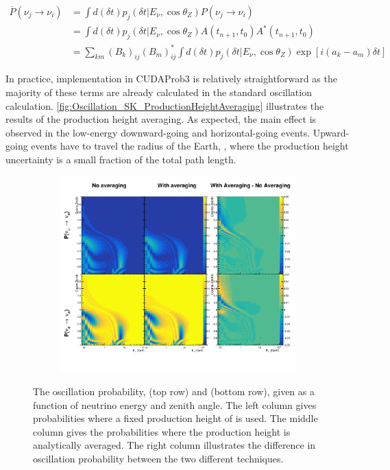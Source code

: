 \begin{equation}
  \begin{split}
    \overline P(\nu_{j} \rightarrow \nu_{i}) &= \int d(\delta t) p_{j}(\delta t|E_{\nu}, \cos\theta_{Z}) P(\nu_{j} \rightarrow \nu_{i}) \\
    &= \int d(\delta t) p_{j}(\delta t|E_{\nu}, \cos\theta_{Z})	A(t_{n+1},t_{0}) A^{*}(t_{n+1},t_{0}) \\
    &= \sum_{km} (B_{k})_{ij} (B_{m})^{*}_{ij} \int d(\delta t) p_{j}(\delta t|E_{\nu}, \cos\theta_{Z}) \exp[i(a_{k}-a_{m})\delta t]
  \end{split}
\end{equation}

In practice, implementation in CUDAProb3 \cite{cudaprob3} is relatively straightforward as the majority of these terms are already calculated in the standard oscillation calculation. \autoref{fig:Oscillation_SK_ProductionHeightAveraging} illustrates the results of the production height averaging. As expected, the main effect is observed in the low-energy downward-going and horizontal-going events. Upward-going events have to travel the radius of the Earth, , where the production height uncertainty is a small fraction of the total path length. 

\begin{figure}[h]
  \begin{subfigure}[t]{\textwidth}
    \includegraphics[width=\textwidth, trim={0mm 0mm 0mm 0mm}, clip,page=1]{Figures/Oscillation/ProductionHeightAveraging.pdf}
  \end{subfigure}
  \caption{The oscillation probability,  (top row) and  (bottom row), given as a function of neutrino energy and zenith angle. The left column gives probabilities where a fixed production height of  is used. The middle column gives the probabilities where the production height is analytically averaged. The right column illustrates the difference in oscillation probability between the two different techniques.}
  \label{fig:Oscillation_SK_ProductionHeightAveraging}
\end{figure}
